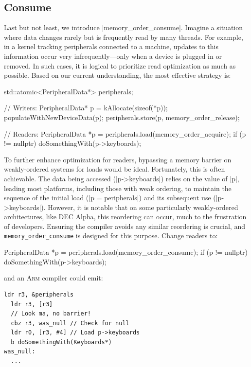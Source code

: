 \documentclass[fontsize=10pt, oneside]{scrartcl}
\newcommand{\monobox}[1]{\mbox{\texttt{#1}}}
\begin{document}
\subsection{Consume}

Last but not least, we introduce \cc|memory_order_consume|.
Imagine a situation where data changes rarely but is frequently read by many threads.
For example, in a kernel tracking peripherals connected to a machine,
updates to this information occur very infrequently—only when a device is plugged in or removed.
In such cases, it is logical to prioritize read optimization as much as possible.
Based on our current understanding, the most effective strategy is:
\begin{cppcode}
std::atomic<PeripheralData*> peripherals;

// Writers:
PeripheralData* p = kAllocate(sizeof(*p));
populateWithNewDeviceData(p);
peripherals.store(p, memory_order_release);
\end{cppcode}
\begin{cppcode}
// Readers:
PeripheralData *p = peripherals.load(memory_order_acquire);
if (p != nullptr) {
    doSomethingWith(p->keyboards);
}
\end{cppcode}

To further enhance optimization for readers,
bypassing a memory barrier on weakly-ordered systems for loads would be ideal.
Fortunately, this is often achievable.
The data being accessed (\cpp|p->keyboards|) relies on the value of \cpp|p|,
leading most platforms, including those with weak ordering,
to maintain the sequence of the initial load (\cpp|p = peripherals|) and its subsequent use (\cpp|p->keyboards|).
However, it is notable that on some particularly weakly-ordered architectures, like DEC Alpha,
this reordering can occur, much to the frustration of developers.
Ensuring the compiler avoids any similar reordering is crucial, and \monobox{memory\_order\_consume} is designed for this purpose.
Change readers to:
\begin{cppcode}
PeripheralData *p = peripherals.load(memory_order_consume);
if (p != nullptr) {
    doSomethingWith(p->keyboards);
}
\end{cppcode}
and an \textsc{Arm} compiler could emit:
\begin{lstlisting}[language={[ARM]Assembler}]
  ldr r3, &peripherals
  ldr r3, [r3]
  // Look ma, no barrier!
  cbz r3, was_null // Check for null
  ldr r0, [r3, #4] // Load p->keyboards
  b doSomethingWith(Keyboards*)
was_null:
  ...
\end{lstlisting}
\end{document}
